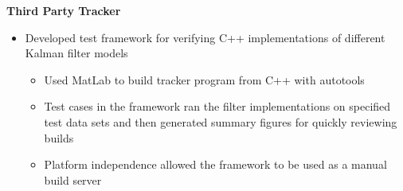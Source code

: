 \documentclass[a4paper]{article}
\begin{document}
\noindent
\hspace{0.120in}
\textbf{Third Party Tracker}
\smallskip

\begin{itemize}
  \item Developed test framework for verifying C++ implementations of different Kalman
    filter models
  \begin{itemize}
    \item Used MatLab to build tracker program from C++ with autotools
    \item Test cases in the framework ran the filter implementations on specified test
      data sets and then generated summary figures for quickly reviewing builds
    \item Platform independence allowed the framework to be used as a manual build
      server
  \end{itemize}
\end{itemize}

\end{document}
